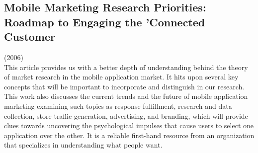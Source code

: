 \documentclass{article}
\begin{document}
\subsection{Mobile Marketing Research Priorities: Roadmap to Engaging the 'Connected Customer}

(2006) \\

This article provides us with a better depth of understanding behind the theory of market research in the mobile application market. It hits upon several key concepts that will be important to incorporate and distinguish in our research.  This work also discusses the current trends and the future of mobile application marketing examining such topics as response fulfillment, research and data collection, store traffic generation, advertising, and branding, which will provide clues towards uncovering the psychological impulses that cause users to select one application over the other. It is a reliable first-hand resource from an organization that specializes in understanding what people want.\\
\end{document}

